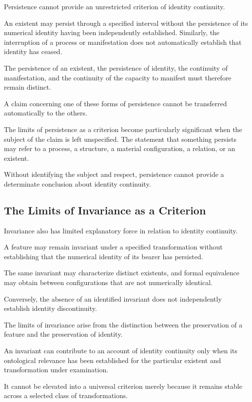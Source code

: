 Persistence cannot provide an unrestricted criterion
of identity continuity.

An existent may persist through a specified interval
without the persistence of its numerical identity
having been independently established. Similarly,
the interruption of a process or manifestation
does not automatically establish that identity
has ceased.

The persistence of an existent, the persistence
of identity, the continuity of manifestation,
and the continuity of the capacity to manifest
must therefore remain distinct.

A claim concerning one of these forms of persistence
cannot be transferred automatically to the others.

The limits of persistence as a criterion become
particularly significant when the subject of the
claim is left unspecified. The statement that
something persists may refer to a process, a
structure, a material configuration, a relation,
or an existent.

Without identifying the subject and respect,
persistence cannot provide a determinate conclusion
about identity continuity.

\subsection{The Limits of Invariance as a Criterion}

Invariance also has limited explanatory force
in relation to identity continuity.

A feature may remain invariant under a specified
transformation without establishing that the
numerical identity of its bearer has persisted.

The same invariant may characterize distinct
existents, and formal equivalence may obtain
between configurations that are not numerically
identical.

Conversely, the absence of an identified invariant
does not independently establish identity
discontinuity.

The limits of invariance arise from the distinction
between the preservation of a feature and the
preservation of identity.

An invariant can contribute to an account of
identity continuity only when its ontological
relevance has been established for the particular
existent and transformation under examination.

It cannot be elevated into a universal criterion
merely because it remains stable across a selected
class of transformations.

